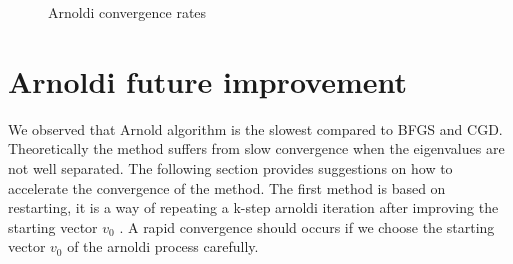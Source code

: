 \documentclass{article}
\numberwithin{equation}{section}
\begin{document}
\begin{figure}[H]
    \label{fig:example}
    \qquad
    \centering
    \qquad
   
    \caption{ Arnoldi convergence rates}
    \label{fig:example}
    
    \label{fig:example}

    
\end{figure}

\section{ Arnoldi future improvement }
We observed that Arnold algorithm is the slowest compared to BFGS and CGD. Theoretically the method suffers from slow convergence when the eigenvalues are not well separated. The following section provides suggestions on how to accelerate the convergence of the method. The first method is based on restarting, it is a way of repeating a k-step arnoldi iteration after improving the starting vector ${v_0}$ . A rapid convergence should occurs if we choose the starting vector ${v_0}$ of the arnoldi process carefully.\\
\end{document}
